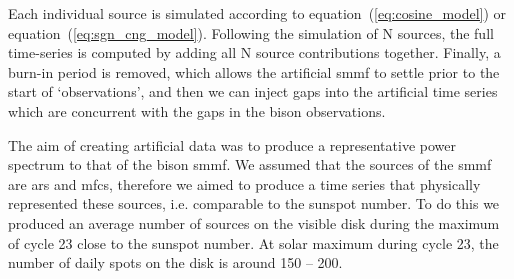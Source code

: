 Each individual source is simulated according to equation~(\ref{eq:cosine_model}) or equation~(\ref{eq:sgn_cng_model}). Following the simulation of N sources, the full time-series is computed by adding all N source contributions together. Finally, a burn-in period is removed, which allows the artificial \gls{smmf} to settle prior to the start of `observations', and then we can inject gaps into the artificial time series which are concurrent with the gaps in the \gls{bison} observations.

The aim of creating artificial data was to produce a representative power spectrum to that of the \gls{bison} \gls{smmf}. We assumed that the sources of the \gls{smmf} are \glspl{ar} and \glspl{mfc}, therefore we aimed to produce a time series that physically represented these sources, i.e. comparable to the sunspot number. To do this we produced an average number of sources on the visible disk during the maximum of cycle 23 close to the sunspot number. At solar maximum during cycle 23, the number of daily spots on the disk is around 150 -- 200. 

